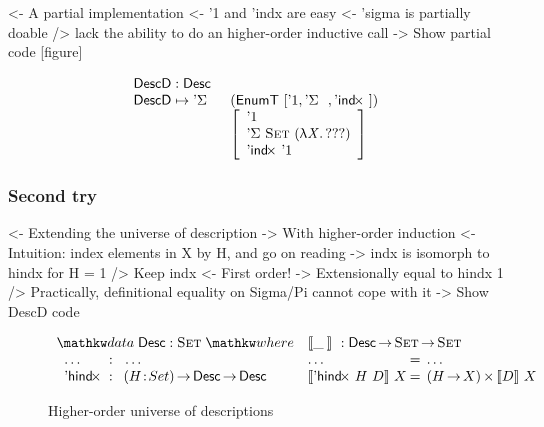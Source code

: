 \begin{structure}
<- A partial implementation
    <- '1 and 'indx are easy
    <- 'sigma is partially doable
        /> lack the ability to do an higher-order inductive call
    -> Show partial code [figure]
\end{structure}

\[\stk{
\DescD : \Desc \\
\begin{array}{@{}ll}
\DescD \mapsto \DSigma{}{} & (\EnumT [ \DUnit, \DSigma{}{}, \DIndx{} ]) \\
                           & \left[\begin{array}{l}
                                   \DUnit                                \\
                                   \DSigma{\Set}{(\LAM{\V{X}} ???)} \\
                                   \DIndx{\DUnit}                                  \\
                                   \end{array}
                             \right]
\end{array}
}\]

\subsubsection{Second try}

\begin{structure}
<- Extending the universe of description
    -> With higher-order induction
    <- Intuition: index elements in X by H, and go on reading
        -> indx is isomorph to hindx for H = 1
    /> Keep indx
        <- First order!
        -> Extensionally equal to hindx 1
        /> Practically, definitional equality on Sigma/Pi cannot cope with it
    -> Show DescD code
\end{structure}

\begin{figure*}

\[
\begin{array}{ll}
\stk{
\data \Desc : \Set \where \\
\;\;\begin{array}{@{}l@{\::\:\:}l@{\quad}l}
    \ldots          & \:\:\ldots \\
    \DHindx         & \PI{H}{Set} \Desc \To \Desc
\end{array}
}
&
\stk{
\descop{\_\:}{} : \Desc \To \Set \To \Set \\
\begin{array}{@{}l@{\:=\:\:}ll}
\ldots                        &  \ldots \\
\descop{\DHindx{H}{D}}{X}     &  \TIMES{(H \To X)}{\descop{D}{X}}
\end{array}
}
\end{array}
\]

\caption{Higher-order universe of descriptions}
\label{fig:hindx_desc}

\end{figure*}

